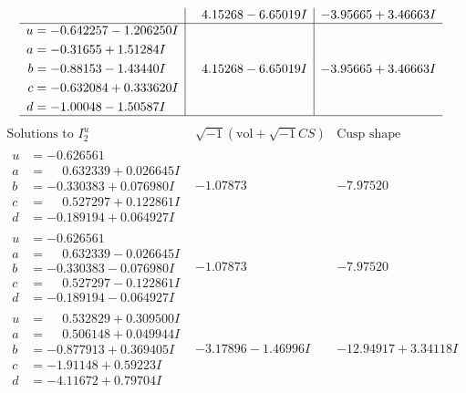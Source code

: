 \documentclass[1p]{elsarticle_modified}
\theoremstyle{definition}
\newcommand{\I}{\sqrt{-1}}
\begin{document}
$$\begin{array}{c|c|c}
 & \phantom{-}4.15268 - 6.65019 I & -3.95665 + 3.46663 I \\ \hline\begin{aligned}
u &= -0.642257 - 1.206250 I \\
a &= -0.31655 + 1.51284 I \\
b &= -0.88153 - 1.43440 I \\
c &= -0.632084 + 0.333620 I \\
d &= -1.00048 - 1.50587 I\end{aligned}
 & \phantom{-}4.15268 - 6.65019 I & -3.95665 + 3.46663 I\\
 \hline 
 \end{array}$$\newpage$$\begin{array}{c|c|c}  
\text{Solutions to }I^u_{2}& \I (\text{vol} + \sqrt{-1}CS) & \text{Cusp shape}\\
 \hline 
\begin{aligned}
u &= -0.626561\phantom{ +0.000000I} \\
a &= \phantom{-}0.632339 + 0.026645 I \\
b &= -0.330383 + 0.076980 I \\
c &= \phantom{-}0.527297 + 0.122861 I \\
d &= -0.189194 + 0.064927 I\end{aligned}
 & -1.07873\phantom{ +0.000000I} & -7.97520\phantom{ +0.000000I} \\ \hline\begin{aligned}
u &= -0.626561\phantom{ +0.000000I} \\
a &= \phantom{-}0.632339 - 0.026645 I \\
b &= -0.330383 - 0.076980 I \\
c &= \phantom{-}0.527297 - 0.122861 I \\
d &= -0.189194 - 0.064927 I\end{aligned}
 & -1.07873\phantom{ +0.000000I} & -7.97520\phantom{ +0.000000I} \\ \hline\begin{aligned}
u &= \phantom{-}0.532829 + 0.309500 I \\
a &= \phantom{-}0.506148 + 0.049944 I \\
b &= -0.877913 + 0.369405 I \\
c &= -1.91148 + 0.59223 I \\
d &= -4.11672 + 0.79704 I\end{aligned}
 & -3.17896 - 1.46996 I & -12.94917 + 3.34118 I \\ \hline\begin{aligned}

\end{aligned}
\end{array}$$
\end{document}
